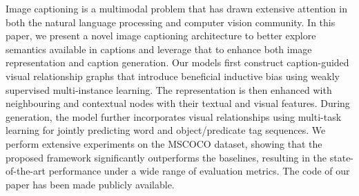 Image captioning is a multimodal problem that has drawn extensive attention in both the natural language processing and computer vision community. In this paper, we present a novel image captioning architecture to better explore semantics available in captions and leverage that to enhance both image representation and caption generation. Our models first construct caption-guided visual relationship graphs that introduce beneficial inductive bias using weakly supervised multi-instance learning. The representation is then enhanced with neighbouring and contextual nodes with their textual and visual features. During generation, the model further incorporates visual relationships using multi-task learning for jointly predicting word and object/predicate tag sequences. We perform extensive experiments on the MSCOCO dataset, showing that the proposed framework significantly outperforms the baselines, resulting in the state-of-the-art performance under a wide range of evaluation metrics. The code of our paper has been made publicly available.
